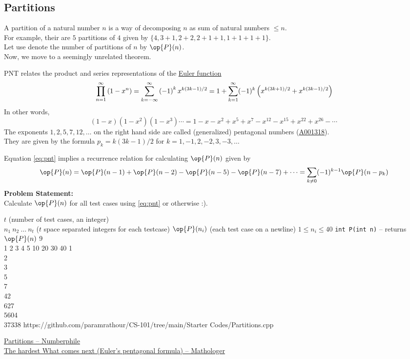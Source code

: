 \documentclass[../../Problems]{subfiles}
\begin{document}
\subsection{Partitions}
A partition of a natural number $n$ is a way of decomposing $n$ as sum of natural numbers $\leq n$.\\
For example, their are $5$ partitions of $4$ given by $\{4, 3+1, 2+2, 2+1+1, 1+1+1+1\}$.\\
Let use denote the number of partitions of $n$ by $\op{P}(n)$.\\
Now, we move to a seemingly unrelated theorem.
\begin{theorem}
	PNT relates the product and series representations of the \href{https://en.wikipedia.org/wiki
	/Euler_function}{Euler function}
	\begin{equation}{\label{eq:pnt}}
		\prod_{n=1}^{\infty}\left(1-x^{n}\right)=\sum_{k=-\infty }^{\infty }\left(-1\right)^{k}x^{k\left(3k-1\right)/2}=1+\sum _{k=1}^{\infty }(-1)^{k}\left(x^{k(3k+1)/2}+x^{k(3k-1)/2}\right)
	\end{equation}
	In other words,
	\begin{equation*}
		(1-x)(1-x^{2})(1-x^{3})\cdots =1-x-x^{2}+x^{5}+x^{7}-x^{12}-x^{15}+x^{22}+x^{26}-\cdots
	\end{equation*}
	The exponents $1, 2, 5, 7, 12,\ldots$ on the right hand side are called (generalized) pentagonal numbers (\href{https://oeis.org/A001318}{A001318}).\\
	They are given by the formula $p_k = k(3k - 1)/2$ for $k = 1, -1, 2, -2, 3,-3,\ldots$
\end{theorem}
Equation \ref{eq:pnt} implies a recurrence relation for calculating $\op{P}(n)$ given by
\begin{equation}
	\op{P}(n)=\op{P}(n-1)+\op{P}(n-2)-\op{P}(n-5)-\op{P}(n-7)+\cdots = \sum_{k\neq 0}(-1)^{k-1}\op{P}(n-p_{k})
\end{equation}
\textbf{Problem Statement:}\\
Calculate $\op{P}(n)$ for all test cases using \ref{eq:pnt} or otherwise :).
\begin{testcasesFunction}
	{$t$ \hfill(number of test cases, an integer)\\
	$n_1\ n_2\ \ldots\ n_t$ \hfill($t$ space separated integers for each testcase)}
	{$\op{P}(n_i)$ \hfill(each test case on a newline)}
	{$1 \leq n_i \leq 40$}
	{\texttt{int P(int n)} -- returns $\op{P}(n)$ }%
	{9\\1 2 3 4 5 10 20 30 40}
	{1\\2\\3\\5\\7\\42\\627\\5604\\37338}
	{https://github.com/paramrathour/CS-101/tree/main/Starter Codes/Partitions.cpp}
\end{testcasesFunction}
\begin{funvideo}
\href{https://youtu.be/NjCIq58rZ8I}{Partitions -- Numberphile}\\
\href{https://youtu.be/iJ8pnCO0nTY}{The hardest What comes next (Euler's pentagonal formula) -- Mathologer}
\end{funvideo}
\end{document}
